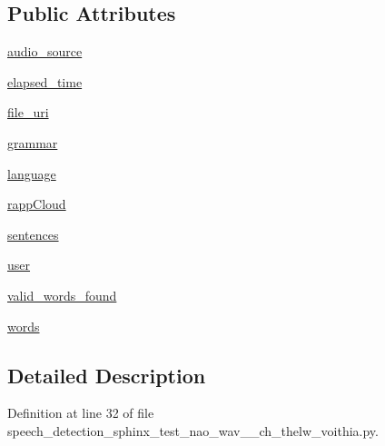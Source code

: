 \subsection*{Public Attributes}
\begin{DoxyCompactItemize}
\item 
\hyperlink{classspeech__detection__sphinx__test__nao__wav__1__ch__thelw__voithia_1_1RappInterfaceTest_a88032501862af85a0bacae9ce280cc8a}{audio\-\_\-source}
\item 
\hyperlink{classspeech__detection__sphinx__test__nao__wav__1__ch__thelw__voithia_1_1RappInterfaceTest_ae1120f227bb1636955f1385895168249}{elapsed\-\_\-time}
\item 
\hyperlink{classspeech__detection__sphinx__test__nao__wav__1__ch__thelw__voithia_1_1RappInterfaceTest_a125bd4c561b4b6264c6cb492657112a4}{file\-\_\-uri}
\item 
\hyperlink{classspeech__detection__sphinx__test__nao__wav__1__ch__thelw__voithia_1_1RappInterfaceTest_aa21a470a9dad7c9da5589f1084ba67f2}{grammar}
\item 
\hyperlink{classspeech__detection__sphinx__test__nao__wav__1__ch__thelw__voithia_1_1RappInterfaceTest_a26a9a989e04071773a1ef29287a59ae4}{language}
\item 
\hyperlink{classspeech__detection__sphinx__test__nao__wav__1__ch__thelw__voithia_1_1RappInterfaceTest_a69970723cf8069b565aab7aec347bfa0}{rapp\-Cloud}
\item 
\hyperlink{classspeech__detection__sphinx__test__nao__wav__1__ch__thelw__voithia_1_1RappInterfaceTest_a0946372f9e30a610921b19d24fc12faa}{sentences}
\item 
\hyperlink{classspeech__detection__sphinx__test__nao__wav__1__ch__thelw__voithia_1_1RappInterfaceTest_abd342d4be2406c38a57beb2d2d3fa38c}{user}
\item 
\hyperlink{classspeech__detection__sphinx__test__nao__wav__1__ch__thelw__voithia_1_1RappInterfaceTest_afd504357193c3c38d8475d5011c160e6}{valid\-\_\-words\-\_\-found}
\item 
\hyperlink{classspeech__detection__sphinx__test__nao__wav__1__ch__thelw__voithia_1_1RappInterfaceTest_a18a99c29262f4f6042425e694aa05b02}{words}
\end{DoxyCompactItemize}


\subsection{Detailed Description}


Definition at line 32 of file speech\-\_\-detection\-\_\-sphinx\-\_\-test\-\_\-nao\-\_\-wav\-\_\-\_\-ch\-\_\-thelw\-\_\-voithia.\-py.



